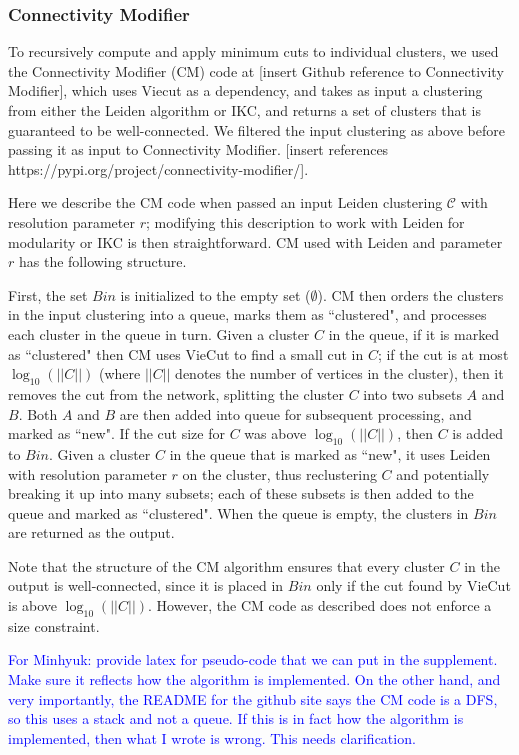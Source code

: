 \documentclass[12pt, oneside]{article}   	%
\begin{document}
\subsubsection{Connectivity Modifier} To recursively compute and apply minimum cuts to individual clusters, we used the Connectivity Modifier (CM) code at [insert Github reference to Connectivity Modifier], which uses Viecut \citep{Henzinger2018,Henzinger2019} as a dependency, and takes as input a clustering from either the Leiden algorithm or IKC, and returns a set of clusters that is guaranteed to be
well-connected. 
We filtered the input clustering as above before passing it as input to Connectivity Modifier. [insert references https://pypi.org/project/connectivity-modifier/].

Here we describe the CM code when passed an input  Leiden clustering $\mathcal{C}$  with resolution parameter $r$; modifying this description to work with 
Leiden for modularity or IKC is then straightforward.
CM used with Leiden and parameter $r$ has the following structure.


First, the set $Bin$ is initialized to the empty set  ($\emptyset$).
CM  then orders the clusters in the input clustering into a queue,  marks them as ``clustered", and processes each cluster in the queue in turn.
Given a cluster $C$ in the queue, if it is marked as ``clustered" then CM uses VieCut to find a small cut in $C$;  if the cut is at most $\log_{10}(||C||)$ (where $||C||$ denotes the number of 
vertices in the cluster), then it removes the cut from the network, splitting the cluster $C$ into two  subsets $A$ and $B$.
Both $A$ and $B$ are then added into  queue for subsequent processing, and marked as ``new". 
If the cut size for $C$ was above $\log_{10}(||C||)$, then $C$ is added to $Bin$.
Given a cluster $C$ in the queue that is marked as ``new", it uses Leiden with resolution parameter $r$ on the cluster, thus reclustering $C$
and potentially breaking it up into many subsets; each of these subsets is then added to the queue and marked as ``clustered".
When the queue is empty, the clusters in $Bin$ are returned as the output.

Note that the structure of the CM algorithm ensures that every cluster $C$ in the output is well-connected, since it is 
placed in $Bin$ only if the cut found by VieCut is above $\log_{10}(||C||)$.
However, the CM code as described does not enforce a size constraint.

\textcolor{blue}{For Minhyuk: provide latex for pseudo-code that we can put in the supplement. Make sure it reflects how the algorithm is implemented. On the other hand, and very importantly, the README for the github site says the CM code is a DFS, so this uses a stack and not a queue.  If this is in fact how the algorithm is implemented, then what I wrote is wrong. This needs clarification.}
\end{document}
